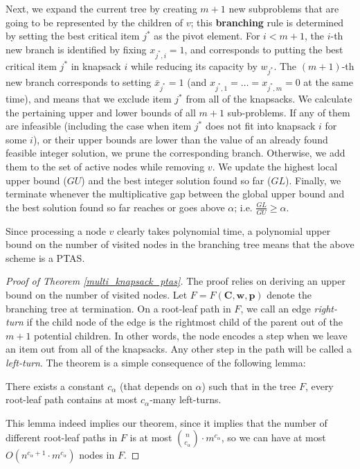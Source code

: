 \documentclass[a4paper,UKenglish,cleveref, autoref, thm-restate, pdfa]{lipics-v2021}
\theoremstyle{plain}
\begin{document}
Next, we expand the current tree by creating $m+1$ new subproblems that are going to be represented by the children of $v$; this \textbf{branching} rule is determined by setting the best critical item $j^*$ as the pivot element. For $i<m+1$, the $i$-th new branch is identified by fixing $x_{j^*, i} = 1$, and corresponds to putting the best critical item $j^*$ in knapsack $i$ while reducing its capacity by $w_{j^*}$. The $(m+1)$-th new branch corresponds to setting $\bar{x}_{j^*} =1$ (and $x_{j^*, 1} = \ldots = x_{j^*, m}=0$ at the same time), and means that we exclude item $j^*$ from all of the knapsacks. We calculate the pertaining upper and lower bounds of all $m+1$ sub-problems. If any of them are infeasible (including the case when item $j^*$ does not fit into knapsack $i$ for some $i$), or their upper bounds are lower than the value of an already found feasible integer solution, we prune the corresponding branch. Otherwise, we add them to the set of active nodes while removing $v$. We update the highest local upper bound ($GU$) and the best integer solution found so far ($GL$). Finally, we terminate whenever the multiplicative gap between the global upper bound and the best solution found so far reaches or goes above $\alpha$; i.e. $\frac{GL}{GU} \ge \alpha$.

Since processing a node $v$ clearly takes polynomial time, a polynomial upper bound on the number of visited nodes in the branching tree means that the above scheme is a PTAS. 

\begin{proof}[Proof of Theorem \ref{multi_knapsack_ptas}]
    The proof relies on deriving an upper bound on the number of visited nodes. Let $F = F(\bm{C}, \bm{w}, \bm{p})$ denote the branching tree at termination. On a root-leaf path in $F$, we call an edge \emph{right-turn} if the child node of the edge is the rightmost child of the parent out of the $m+1$ potential children. In other words, the node encodes a step when we leave an item out from all of the knapsacks. Any other step in the path will be called a \emph{left-turn}. The theorem is a simple consequence of the following lemma:

    \begin{lmm}\label{root-leaf}
        There exists a constant $c_{\alpha}$ (that depends on $\alpha$) such that in the tree $F$, every root-leaf path contains at most $c_{\alpha}$-many left-turns.
    \end{lmm}

    This lemma indeed implies our theorem, since it implies that the number of different root-leaf paths in $F$ is at most $\binom{n}{c_{\alpha}}\cdot m^{c_{\alpha}}$, so we can have at most $O(n^{c_{\alpha}+1} \cdot m ^{c_{\alpha}})$ nodes in $F$.
\end{proof}
\end{document}
